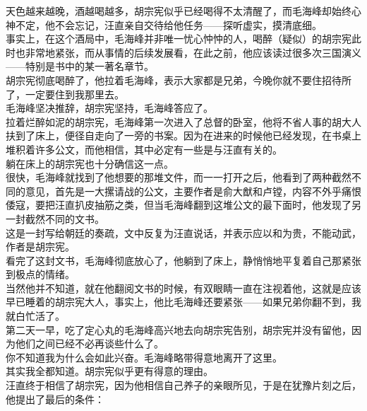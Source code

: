 \begin{multicols}{\theparacolNo}
天色越来越晚，酒越喝越多，胡宗宪似乎已经喝得不太清醒了，而毛海峰却始终心神不定，他不会忘记，汪直亲自交待给他任务——探听虚实，摸清底细。\\

事实上，在这个酒局中，毛海峰并非唯一忧心忡忡的人，喝醉（疑似）的胡宗宪此时也非常地紧张，而从事情的后续发展看，在此之前，他应该读过很多次三国演义——特别是书中的某一著名章节。\\

胡宗宪彻底喝醉了，他拉着毛海峰，表示大家都是兄弟，今晚你就不要住招待所了，一定要住到我那里去。\\

毛海峰坚决推辞，胡宗宪坚持，毛海峰答应了。\\

拉着烂醉如泥的胡宗宪，毛海峰第一次进入了总督的卧室，他将不省人事的胡大人扶到了床上，便径自走向了一旁的书案。因为在进来的时候他已经发现，在书桌上堆积着许多公文，而他相信，其中必定有一些是与汪直有关的。\\

躺在床上的胡宗宪也十分确信这一点。\\

很快，毛海峰就找到了他想要的那堆文件，而一一打开之后，他看到了两种截然不同的意见，首先是一大摞请战的公文，主要作者是俞大猷和卢镗，内容不外乎痛恨倭寇，要把汪直扒皮抽筋之类，但当毛海峰翻到这堆公文的最下面时，他发现了另一封截然不同的文书。\\

这是一封写给朝廷的奏疏，文中反复为汪直说话，并表示应以和为贵，不能动武，作者是胡宗宪。\\

看完了这封文书，毛海峰彻底放心了，他躺到了床上，静悄悄地平复着自己那紧张到极点的情绪。\\

当然他并不知道，就在他翻阅文书的时候，有双眼睛一直在注视着他，这就是应该早已睡着的胡宗宪大人，事实上，他比毛海峰还要紧张——如果兄弟你翻不到，我就白忙活了。\\

第二天一早，吃了定心丸的毛海峰高兴地去向胡宗宪告别，胡宗宪并没有留他，因为他们之间已经不必再谈些什么了。\\

你不知道我为什么会如此兴奋。毛海峰略带得意地离开了这里。\\

其实我全都知道。胡宗宪似乎更有得意的理由。\\

汪直终于相信了胡宗宪，因为他相信自己养子的亲眼所见，于是在犹豫片刻之后，他提出了最后的条件：\\


\end{multicols}

